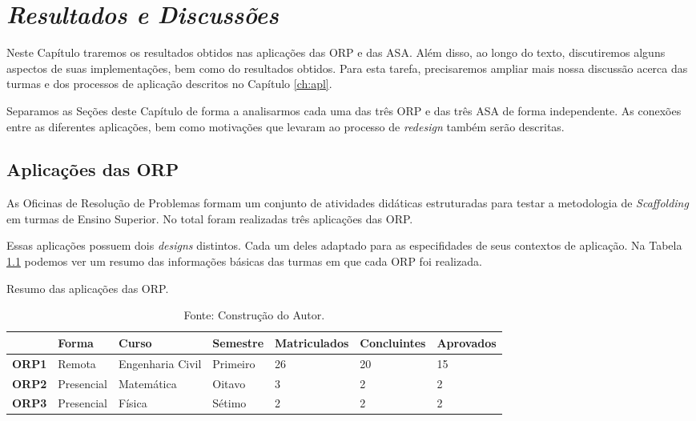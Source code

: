 \chapter{\textit{Resultados e Discussões}} \label{ch:resanddisc}

Neste Capítulo traremos os resultados obtidos nas aplicações das ORP e das ASA. Além disso, ao longo do texto, discutiremos alguns aspectos de suas implementações, bem como do resultados obtidos. Para esta tarefa, precisaremos ampliar mais nossa discussão acerca das turmas e dos processos de aplicação descritos no Capítulo \ref{ch:apl}. 

Separamos as Seções deste Capítulo de forma a analisarmos cada uma das três ORP e das três ASA de forma independente. As conexões entre as diferentes aplicações, bem como motivações que levaram ao processo de \textit{redesign} também serão descritas.

\section{Aplicações das ORP}

As Oficinas de Resolução de Problemas formam um conjunto de atividades didáticas estruturadas para testar a metodologia de \textit{Scaffolding} em turmas de Ensino Superior. No total foram realizadas três aplicações das ORP.

Essas aplicações possuem dois \textit{designs} distintos. Cada um deles adaptado para as especifidades de seus contextos de aplicação. Na Tabela \ref{tab:aplORP} podemos ver um resumo das informações básicas das turmas em que cada ORP foi realizada.

\begin{table}[ht]
\centering
\caption{Resumo das aplicações das ORP.}
\label{tab:aplORP}
\begin{adjustbox}{max width=\textwidth}
\begin{tabular}{lllllll}
\toprule
& \textbf{Forma} & \textbf{Curso} & \textbf{Semestre} & \textbf{Matriculados} & \textbf{Concluintes} & \textbf{Aprovados} \\
\midrule
\textbf{ORP1} & Remota & Engenharia Civil & Primeiro & 26 & 20 & 15 \\
\textbf{ORP2} & Presencial & Matemática & Oitavo & 3 & 2 & 2 \\
\textbf{ORP3} & Presencial & Física & Sétimo & 2 & 2 & 2 \\
\bottomrule
\end{tabular}
\end{adjustbox}
\caption*{Fonte: Construção do Autor.}
\end{table}


